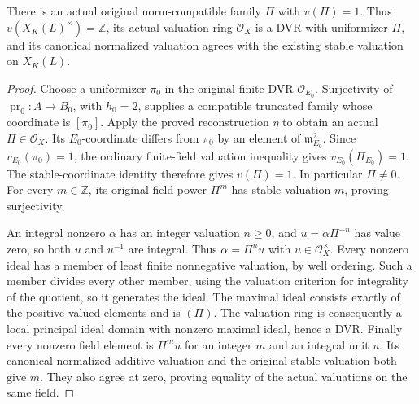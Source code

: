 \begin{theorem}
\label{fw:norm-limit-uniformizer}
\leanok
There is an actual original norm-compatible family $\Pi$ with $v(\Pi)=1$.
Thus $v(X_K(L)^\times)=\mathbb Z$, its actual valuation ring
$\mathcal O_X$ is a DVR with uniformizer $\Pi$, and its canonical
normalized valuation agrees with the existing stable valuation on $X_K(L)$.
\end{theorem}
\begin{proof}
Choose a uniformizer $\pi_0$ in the original finite DVR $\mathcal O_{E_0}$.
Surjectivity of $\operatorname{pr}_0:A\to B_0$, with $h_0=2$, supplies
a compatible truncated family whose coordinate is $[\pi_0]$.
Apply the proved reconstruction $\eta$ to obtain an actual $\Pi\in\mathcal O_X$.
Its $E_0$-coordinate differs from $\pi_0$ by an element of
$\mathfrak m_{E_0}^2$. Since $v_{E_0}(\pi_0)=1$, the ordinary finite-field
valuation inequality gives $v_{E_0}(\Pi_{E_0})=1$.
The stable-coordinate identity therefore gives $v(\Pi)=1$.
In particular $\Pi\ne0$. For every $m\in\mathbb Z$, its original
field power $\Pi^m$ has stable valuation $m$, proving surjectivity.

An integral nonzero $\alpha$ has an integer valuation $n\geq0$, and
$u=\alpha\Pi^{-n}$ has value zero, so both $u$ and $u^{-1}$ are
integral. Thus $\alpha=\Pi^n u$ with $u\in\mathcal O_X^\times$.
Every nonzero ideal has a member of least finite nonnegative valuation,
by well ordering. Such a member divides every other member, using the
valuation criterion for integrality of the quotient, so it generates
the ideal. The maximal ideal consists exactly of the positive-valued
elements and is $(\Pi)$. The valuation ring is consequently a local
principal ideal domain with nonzero maximal ideal, hence a DVR.
Finally every nonzero field element is $\Pi^m u$ for an integer $m$
and an integral unit $u$. Its canonical normalized additive valuation
and the original stable valuation both give $m$. They also agree at
zero, proving equality of the actual valuations on the same field.
\end{proof}

